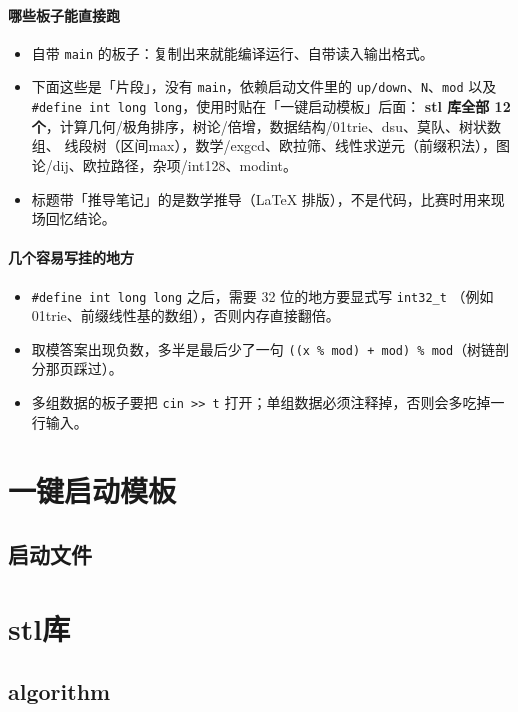 \documentclass[11pt,a4paper]{ctexart}
\begin{document}
\paragraph{哪些板子能直接跑}
\begin{itemize}
  \item 自带 \texttt{main} 的板子：复制出来就能编译运行、自带读入输出格式。
  \item 下面这些是「片段」，没有 \texttt{main}，依赖启动文件里的 \texttt{up/down}、\texttt{N}、\texttt{mod}
        以及 \texttt{\#define int long long}，使用时贴在「一键启动模板」后面：
        \textbf{stl 库全部 12 个}，计算几何/极角排序，树论/倍增，数据结构/01trie、dsu、莫队、树状数组、
        线段树（区间max），数学/exgcd、欧拉筛、线性求逆元（前缀积法），图论/dij、欧拉路径，杂项/int128、modint。
  \item 标题带「推导笔记」的是数学推导（LaTeX 排版），不是代码，比赛时用来现场回忆结论。
\end{itemize}

\paragraph{几个容易写挂的地方}
\begin{itemize}
  \item \texttt{\#define int long long} 之后，需要 32 位的地方要显式写 \texttt{int32\_t}
        （例如 01trie、前缀线性基的数组），否则内存直接翻倍。
  \item 取模答案出现负数，多半是最后少了一句 \texttt{((x \% mod) + mod) \% mod}（树链剖分那页踩过）。
  \item 多组数据的板子要把 \texttt{cin >> t} 打开；单组数据必须注释掉，否则会多吃掉一行输入。
\end{itemize}
\section{一键启动模板}
\subsection{启动文件}


\section{stl库}
\subsection{algorithm}

\end{document}
